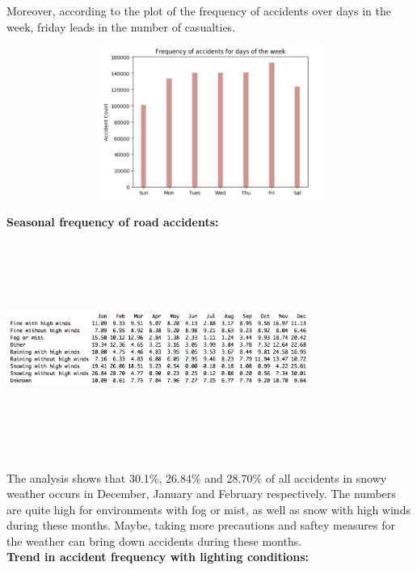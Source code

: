 \documentclass[a4paper, 10pt]{article}
\begin{document}
  Moreover, according to the plot of the frequency of accidents over days in the week, friday leads in the number of casualties. 
   
   \begin{center}
     \includegraphics[width=30cm,height=5cm, scale=0.8,keepaspectratio]{day-study.png}
   \end{center}

   \textbf{Seasonal frequency of road accidents:}

   \begin{center}
     \includegraphics[width=10cm,height=7cm, scale=0.7,keepaspectratio]{seasonal-study.png}
   \end{center}

   The analysis shows that 30.1\%, 26.84\% and 28.70\% of all accidents in snowy weather occurs in December, January and February respectively. The numbers are quite high for environments with
   fog or mist, as well as snow with high winds during these months. Maybe, taking more precautions and saftey measures for the weather can bring down accidents during these months. \\

   \textbf{Trend in accident frequency with lighting conditions:}
   
\end{document}
